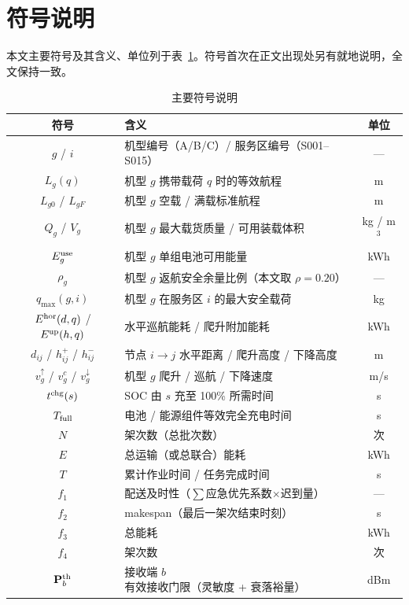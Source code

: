 \section{符号说明}

本文主要符号及其含义、单位列于表~\ref{tab:symbols}。符号首次在正文出现处另有就地说明，全文保持一致。

\begin{table}[htbp]
\centering
\caption{主要符号说明}
\label{tab:symbols}
\small
\begin{tabular}{c|l|c}
\toprule
\textbf{符号} & \textbf{含义} & \textbf{单位} \\
\midrule
$g$ / $i$ & 机型编号（A/B/C）/ 服务区编号（S001--S015） & --- \\
$L_g(q)$ & 机型 $g$ 携带载荷 $q$ 时的等效航程 & m \\
$L_{g0}$ / $L_{gF}$ & 机型 $g$ 空载 / 满载标准航程 & m \\
$Q_g$ / $V_g$ & 机型 $g$ 最大载货质量 / 可用装载体积 & kg / m$^3$ \\
$E^{\rm use}_g$ & 机型 $g$ 单组电池可用能量 & kWh \\
$\rho_g$ & 机型 $g$ 返航安全余量比例（本文取 $\rho=0.20$） & --- \\
$q_{\max}(g,i)$ & 机型 $g$ 在服务区 $i$ 的最大安全载荷 & kg \\
$E^{\rm hor}(d,q)$ / $E^{\rm up}(h,q)$ & 水平巡航能耗 / 爬升附加能耗 & kWh \\
$d_{ij}$ / $h^{+}_{ij}$ / $h^{-}_{ij}$ & 节点 $i\to j$ 水平距离 / 爬升高度 / 下降高度 & m \\
$v^{\uparrow}_g$ / $v^{c}_g$ / $v^{\downarrow}_g$ & 机型 $g$ 爬升 / 巡航 / 下降速度 & m/s \\
$t^{\rm chg}(s)$ & SOC 由 $s$ 充至 100\% 所需时间 & s \\
$T_{\rm full}$ & 电池 / 能源组件等效完全充电时间 & s \\
$N$ & 架次数（总批次数） & 次 \\
$E$ & 总运输（或总联合）能耗 & kWh \\
$T$ & 累计作业时间 / 任务完成时间 & s \\
$f_1$ & 配送及时性（$\sum$应急优先系数$\times$迟到量） & --- \\
$f_2$ & makespan（最后一架次结束时刻） & s \\
$f_3$ & 总能耗 & kWh \\
$f_4$ & 架次数 & 次 \\
$\mathbf{P}^{\rm th}_b$ & 接收端 $b$ 有效接收门限（灵敏度 + 衰落裕量） & dBm \\

\end{tabular}
\end{table}
